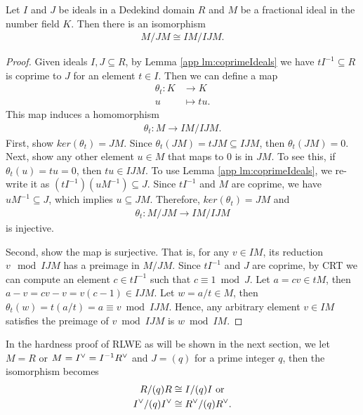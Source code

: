 \documentclass[../main.tex]{subfiles}
\begin{document}
\begin{lemma}
Let $I$ and $J$ be ideals in a Dedekind domain $R$ and $M$ be a fractional ideal in the number field $K$. Then there is an isomorphism 
\begin{align*}
    M/JM \cong IM/IJM.
\end{align*}
\end{lemma}

\begin{proof}
Given ideals $I,J\subseteq R$, by Lemma \ref{app lm:coprimeIdeals} we have $tI^{-1} \subseteq R$ is coprime to $J$ for an element $t \in I$. Then we can define a map 
\begin{align*}
    \theta_t: K &\rightarrow K \\
    u &\mapsto tu.
\end{align*}
This map induces a homomorphism 
\begin{align*}
    \theta_t: M \rightarrow IM/IJM.
\end{align*}
First, show $ker(\theta_t)=JM$. Since $\theta_t(JM)=tJM \subseteq IJM$, then $\theta_t(JM)=0$. Next, show any other element $u \in M$ that maps to 0 is in $JM$. To see this, if $\theta_t(u)=tu=0$, then $tu \in IJM$. To use Lemma \ref{app lm:coprimeIdeals}, we re-write it as $(tI^{-1}) (uM^{-1})\subseteq J$. Since $tI^{-1}$ and $M$ are coprime, we have $uM^{-1}\subseteq J$, which implies $u\subseteq JM$. Therefore, $ker(\theta_t)=JM$ and
\begin{align*}
    \theta_t: M/JM \rightarrow IM/IJM
\end{align*}
is injective. 

Second, show the map is surjective. That is, for any $v \in IM$, its reduction $v \mod IJM$ has a preimage in $M/JM$. Since $tI^{-1}$ and $J$ are coprime, by CRT we can compute an element $c \in tI^{-1}$ such that $c \equiv 1 \bmod J$. Let $a = cv \in tM$, then $a-v=cv-v=v(c-1) \in IJM$. Let $w=a/t \in M$, then $\theta_t(w)=t (a/t)=a \equiv v \bmod IJM$. Hence, any arbitrary element $v \in IM$ satisfies the preimage of $v \bmod IJM$ is $w \bmod IM$. 
\end{proof}

In the hardness proof of RLWE as will be shown in the next section, we let $M=R$ or $M=I^{\vee}=I^{-1}R^{\vee}$ and $J=(q)$ for a prime integer $q$, then the isomorphism becomes 
\begin{align*}
    R/(q)R &\cong I/(q)I \text{ or } \\
    I^{\vee} / (q)I^{\vee} &\cong R^{\vee} / (q)R^{\vee}.
\end{align*}
\end{document}
